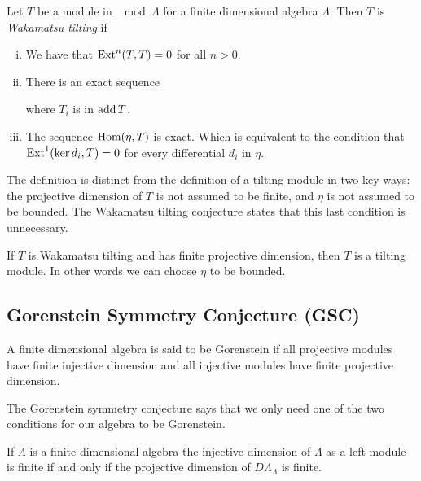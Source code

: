 \begin{defn}
	Let $T$ be a module in $\mod\Lambda$ for a finite dimensional algebra $\Lambda$. Then $T$ is \emph{Wakamatsu tilting} if
	\begin{enumerate}[i)]
		\item We have that $\operatorname{Ext}^n(T,T)=0$ for all $n >0$.
		\item There is an exact sequence 
		\begin{center}
		\end{center}
		where $T_i$ is in $\operatorname{add} T$.
		\item The sequence $\operatorname{Hom}(\eta, T)$ is exact. Which is equivalent to the condition that $\operatorname{Ext}^1(\operatorname{ker} d_i, T)=0$ for every differential $d_i$ in $\eta$.
	\end{enumerate}
\end{defn}

The definition is distinct from the definition of a tilting module in two key ways: the projective dimension of $T$ is not assumed to be finite, and $\eta$ is not assumed to be bounded. The Wakamatsu tilting conjecture states that this last condition is unnecessary.

\begin{conj} 
	If $T$ is Wakamatsu tilting and has finite projective dimension, then $T$ is a tilting module. In other words we can choose $\eta$ to be bounded.
\end{conj}

\subsection*{Gorenstein Symmetry Conjecture (GSC)}

\begin{defn}
	A finite dimensional algebra is said to be Gorenstein if all projective modules have finite injective dimension and all injective modules have finite projective dimension.
\end{defn}

The Gorenstein symmetry conjecture says that we only need one of the two conditions for our algebra to be Gorenstein.

\begin{conj} 
	If $\Lambda$ is a finite dimensional algebra the injective dimension of $\Lambda$ as a left module is finite if and only if the projective dimension of $D\Lambda_\Lambda$ is finite.
\end{conj}

